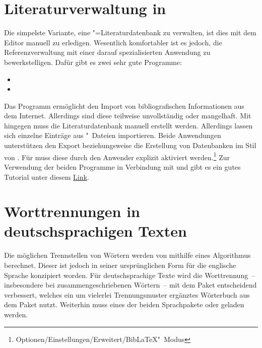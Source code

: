 \section{Literaturverwaltung in }
%
Die simpelste Variante, eine "=Literaturdatenbank zu verwalten, 
ist dies mit dem Editor manuell zu erledigen. Wesentlich komfortabler ist es 
jedoch, die Referenzverwaltung mit einer darauf spezialisierten Anwendung zu 
bewerkstelligen. Dafür gibt es zwei sehr gute Programme:
%
\begin{itemize}
\item {}
\item {}
\end{itemize}
%
Das Programm  ermöglicht den Import von bibliografischen 
Informationen aus dem Internet. Allerdings sind diese teilweise unvollständig 
oder mangelhaft. Mit  hingegen muss die Literaturdatenbank 
manuell erstellt werden. Allerdings lassen sich einzelne Einträge aus 
"~Dateien importieren. Beide Anwendungen unterstützen den Export 
beziehungsweise die Erstellung von Datenbanken im Stil von . 
Für  muss diese durch den Anwender explizit aktiviert 
werden.\footnote{Optionen/Einstellungen/Erweitert/BibLaTeX"~Modus} 
Zur Verwendung der beiden Programme in Verbindung mit  und 
 gibt es ein gutes Tutorial unter diesem
\href{http://www.suedraum.de/latex/stammtisch/degenkolb_latex_biblatex_folien-final.pdf}{Link}.



\section{Worttrennungen in deutschsprachigen Texten}
%
Die möglichen Trennstellen von Wörtern werden von  mithilfe 
eines Algorithmus berechnet. Dieser ist jedoch in seiner ursprünglichen Form 
für die englische Sprache konzipiert worden. Für deutschsprachige Texte wird 
die Worttrennung~-- insbesondere bei zusammengeschriebenen Wörtern~-- mit dem 
Paket  entscheidend verbessert, welches ein um vielerlei 
Trennungsmuster ergänztes Wörterbuch aus dem Paket  
nutzt. Weiterhin muss eines der beiden Sprachpakete  oder
 geladen werden. 

